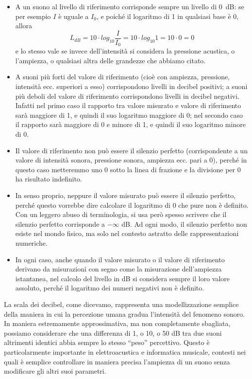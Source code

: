 \begin{itemize}

\item A un suono al livello di riferimento corrisponde sempre un livello di \qty{0}{dB}: se per esempio $I$ è uguale a $I_0$, e poiché il logaritmo di 1 in qualsiasi base è 0, allora
\begin{equation}
L_{dB} = 10 \cdot log_{10}\frac{I}{I_0} = 10 \cdot log_{10}1 = 10 \cdot 0 = 0
\end{equation}
e lo stesso vale se invece dell'intensità si considera la pressione acustica, o l'ampiezza, o qualsiasi altra delle grandezze che abbiamo citato.

\item A suoni più forti del valore di riferimento (cioè con ampiezza, pressione, intensità ecc. superiori a esso) corrispondono livelli in decibel positivi; a suoni più deboli del valore di riferimento corrispondono livelli in decibel negativi. Infatti nel primo caso il rapporto tra valore misurato e valore di riferimento sarà maggiore di 1, e quindi il suo logaritmo maggiore di 0; nel secondo caso il rapporto sarà maggiore di 0 e minore di 1, e quindi il suo logaritmo minore di 0.

\item Il valore di riferimento non può essere il silenzio perfetto (corrispondente a un valore di intensità sonora, pressione sonora, ampiezza ecc. pari a 0), perché in questo caso metteremmo uno 0 sotto la linea di frazione e la divisione per 0 ha risultato indefinito.

\item In senso proprio, neppure il valore misurato può essere il silenzio perfetto, perché questo vorrebbe dire calcolare il logaritmo di 0 che pure non è definito. Con un leggero abuso di terminologia, si usa però spesso scrivere che il silenzio perfetto corrisponde a $-\infty$ dB. Ad ogni modo, il silenzio perfetto non esiste nel mondo fisico, ma solo nel contesto astratto delle rappresentazioni numeriche.

\item In ogni caso, anche quando il valore misurato o il valore di riferimento derivano da misurazioni con segno come la misurazione dell'ampiezza istantanea, nel calcolo del livello in dB si considera sempre il loro valore assoluto, perché il logaritmo dei numeri negativi non è definito.

\end{itemize}

La scala dei decibel, come dicevamo, rappresenta una modellizzazione semplice della maniera in cui la percezione umana gradua l'intensità del fenomeno sonoro. In maniera estremamente approssimativa, ma non completamente sbagliata, possiamo considerare che una differenza di 1, o 10, o 50 dB tra due suoni altrimenti identici abbia sempre lo stesso ``peso'' percettivo. Questo è particolarmente importante in elettroacustica e informatica musicale, contesti nei quali è semplice controllare in maniera precisa l'ampiezza di un suono senza modificare gli altri suoi parametri. 



